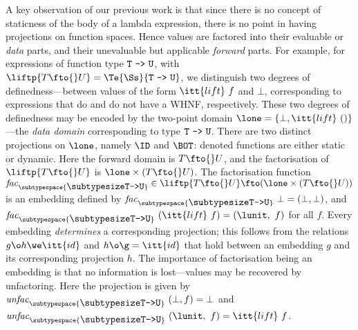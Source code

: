 \documentclass[11pt]{article}
\begin{document}
A key observation of our previous work
\cite{Dav93b} is that since there is no concept
of staticness of the body of a lambda expression, there is no point in
having projections on function spaces.  Hence values are factored into
their evaluable or {\it data\/} parts, and their unevaluable but
applicable {\it forward\/} parts.  For example, for expressions of
function type ${\mbox{\tt T}\ \mbox{\tt ->}\ \mbox{\tt U}}$, with
$\liftp{T\fto{}U}=\Te{\Ss}{\mbox{\tt T}\ \mbox{\tt ->}\ \mbox{\tt U}}$, we distinguish two
degrees of definedness---between values of the form
$\itt{lift}~f$ and $\bot$, corresponding to expressions that do and
do not have a WHNF, respectively.  These two degrees of definedness 
may be encoded by the two-point
domain $\lone=\{\bot, \itt{lift}~()\}$---the {\it data domain\/} corresponding
to type ${\mbox{\tt T}\ \mbox{\tt ->}\ \mbox{\tt U}}$.  There are two distinct projections on $\lone$,
namely $\ID$ and $\BOT$: denoted functions are 
either static or dynamic.  Here 
the forward domain is $T\fto{}U$, and the factorisation of $\liftp{T\fto{}U}$
is $\lone\times(T\fto{}U)$.  The factorisation function
${\it{}fac}_{\subtypespace{\makebox{\subtypesize\tt T->U}} }\in\liftp{T\fto{}U}\fto(\lone\times(T\fto{}U))$
is an embedding defined by
${\it{}fac}_{\subtypespace{\makebox{\subtypesize\tt T->U}} }~\bot=(\bot,\bot)$, and
${\it{}fac}_{\subtypespace{\makebox{\subtypesize\tt T->U}} }~(\itt{lift}~f)=(\lunit,~f)$ for all $f$.
Every embedding {\it determines\/} a corresponding projection; 
this follows from the relations $g\o h\we\itt{id}$ and $h\o\g=\itt{id}$
that hold between an embedding $g$ and its corresponding projection $h$.
The importance of factorisation being an embedding is that no information
is lost---values may be recovered by unfactoring.  Here the
projection is given by
${\it{}unfac}_{\subtypespace{\makebox{\subtypesize\tt T->U}} }~(\bot,f)=\bot$ and
${\it{}unfac}_{\subtypespace{\makebox{\subtypesize\tt T->U}} }~(\lunit,~f)=\itt{lift}~f$.
\end{document}
